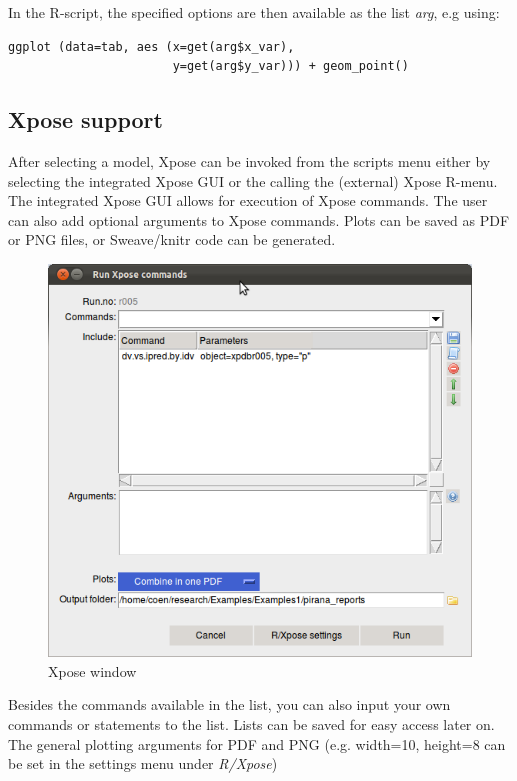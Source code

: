 {{{{\noindent In the R-script, the specified options are then available
as the list \textit{arg}, e.g using:

\begin{lstlisting}
ggplot (data=tab, aes (x=get(arg$x_var), 
                       y=get(arg$y_var))) + geom_point()
\end{lstlisting}


\subsection{Xpose support}
After selecting a model, Xpose can be invoked from the scripts menu either by
selecting the integrated Xpose GUI or the calling the (external) Xpose R-menu.
The integrated Xpose GUI allows for execution of Xpose commands. The user can also add
optional arguments to Xpose commands.  Plots can be saved as PDF or
PNG files, or Sweave/knitr code can be generated.

\begin{figure}[H] \centering
    \includegraphics[scale=0.5]{images/xposewindow.png}
    \caption{Xpose window}
\end{figure}

\noindent Besides the commands available in the list, you can also input your
own commands or statements to the list. Lists can be saved for easy
access later on. The general plotting arguments for PDF and PNG
(e.g. {\ttfamily width=10, height=8} can be set in the settings menu
under \textit{R/Xpose})

}}}}

